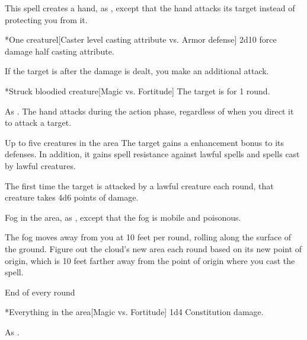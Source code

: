 \spellrng{\rngmed}
\spelldur{\durshort \dismissable}
\spellline
\spelleffect This spell creates a hand, as , except that the hand attacks its target instead of protecting you from it.
\begin{spelltarget}*{One creature}l[Caster level \add casting attribute vs. Armor defense]
    \spellsuccess 2d10 force damage \add half casting attribute.

    If the target is \bloodied after the damage is dealt, you make an additional attack.
    \begin{spelltarget}*{Struck bloodied creature}[Magic vs. Fortitude]
        \spellsuccess The target is \dazed for 1 round.
    \end{spelltarget}
\end{spelltarget}
\spellnotes As . The hand attacks during the action phase, regardless of when you direct it to attack a target.

\spelldur{\durshort \dismissable}
\begin{spelltargets}{Up to five creatures in the area}
    The target gains a  enhancement bonus to its defenses. In addition, it gains spell resistance against lawful spells and spells cast by lawful creatures.
    \par The first time the target is attacked by a lawful creature each round, that creature takes 4d6 points of damage.
\end{spelltargets}

\spelldur{\durshort}
\spellline
\spelleffect Fog in the area, as , except that the fog is mobile and poisonous.

\par The fog moves away from you at 10 feet per round, rolling along the surface of the ground. Figure out the cloud's new area each round based on its new point of origin, which is 10 feet farther away from the point of origin where you cast the spell.
\begin{spelltrigger}{End of every round}
    \begin{spelltargets}*{Everything in the area}[Magic vs. Fortitude]
        \spellsuccess 1d4 Constitution damage.
    \end{spelltargets}
\end{spelltrigger}
\spellnotes As .

